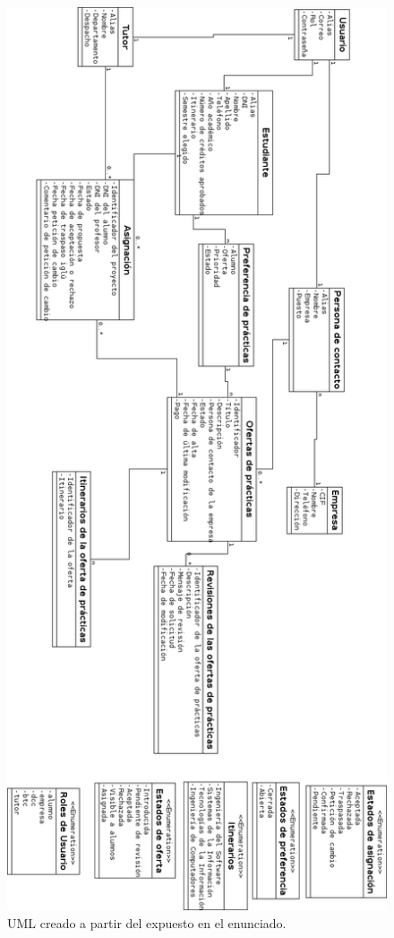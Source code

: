 \documentclass[pdftex,11pt,a4paper]{book}
\begin{document}
\begin{figure}[h]
\begin{center}
\includegraphics[width=\textwidth]{img/uml_propio}
\caption{\label{uml_propio} UML creado a partir del expuesto en el enunciado.}
\end{center}
\end{figure}
\end{document}
